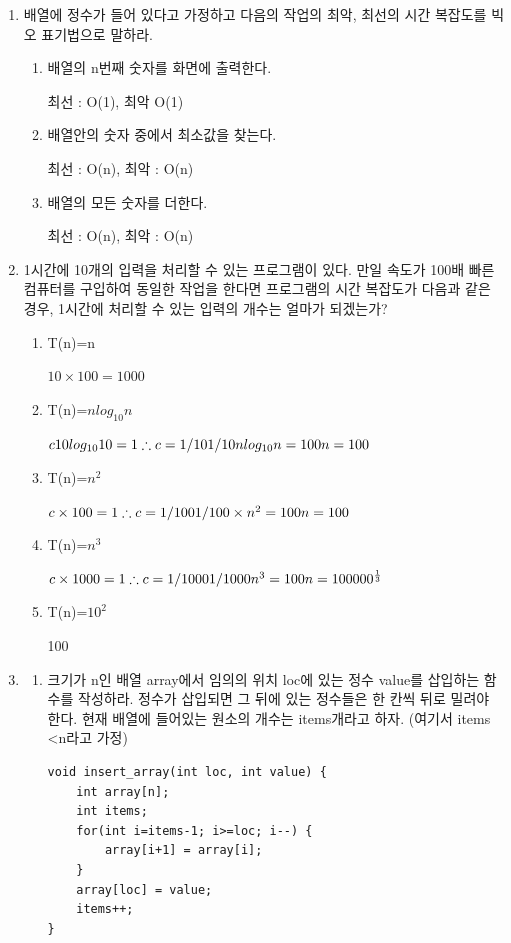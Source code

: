 \documentclass[11pt,a4paper]{article}
\begin{document}
\begin{enumerate}
\item 배열에 정수가 들어 있다고 가정하고 다음의 작업의 최악, 최선의 시간 복잡도를 빅오 표기법으로 말하라.
\begin{enumerate}
	\item 배열의 n번째 숫자를 화면에 출력한다. 
	
	최선 : O(1), 최악 O(1)
	
	\item 배열안의 숫자 중에서 최소값을 찾는다.
	
	최선 : O(n), 최악 : O(n)
	
	\item 배열의 모든 숫자를 더한다.
	
	최선 : O(n), 최악 : O(n)
	
\end{enumerate}
\item 1시간에 10개의 입력을 처리할 수 있는 프로그램이 있다. 만일 속도가 100배 빠른 컴퓨터를 구입하여 동일한 작업을 한다면 프로그램의 시간 복잡도가 다음과 같은 경우, 1시간에 처리할 수 있는 입력의 개수는 얼마가 되겠는가? 

\begin{enumerate}
\item T(n)=n 

$10\times 100 = 1000$
\item T(n)=$nlog_{10}n$

$c10log_{10}10=1\\
\therefore  c=1/10\\1/10nlog_{10}n=100\\n=100$

\item T(n)=$n^2$

$c\times 100 = 1\\\therefore c=1/100 \\
1/100\times n^2=100\\ n=100$
\item T(n)=$n^3$

$c\times 1000 = 1\\\therefore c=1/1000\\1/1000n^3=100\\n=100000^{\frac{1}{3}}$
\item T(n)=$10^2$

100
\end{enumerate}
\item
\begin{enumerate}
	
\item 크기가 n인 배열 array에서 임의의 위치 loc에 있는 정수 value를 삽입하는 함수를 작성하라. 정수가 삽입되면 그 뒤에 있는 정수들은 한 칸씩 뒤로 밀려야 한다. 현재 배열에 들어있는 원소의 개수는 items개라고 하자. (여기서 items \textless n라고 가정)
\begin{lstlisting}
void insert_array(int loc, int value) {
	int array[n];
	int items;
	for(int i=items-1; i>=loc; i--) {
		array[i+1] = array[i];
	}
	array[loc] = value;
	items++;
}
\end{lstlisting}


\end{enumerate}
\end{enumerate}
\end{document}
